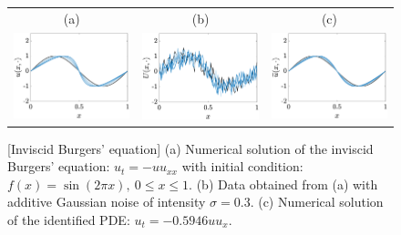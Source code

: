 \documentclass[a4paper,11pt]{article}
\begin{document}
\begin{figure}
\centering
\begin{tabular}{ccc}
(a)&(b)&(c)\\
\includegraphics[width=2in]{Figures/burgers_sol.eps}&
\includegraphics[width=2in]{Figures/burgers_noise.eps}&
\includegraphics[width=2in]{Figures/burgers_resimul.eps}
\end{tabular}
\caption{[Inviscid Burgers' equation] (a) Numerical solution of the inviscid Burgers' equation: $u_t=-uu_{xx}$ with initial condition: $f(x)=\sin(2\pi x),~0\leq x\leq 1$. (b) Data obtained from (a) with additive Gaussian noise of intensity $\sigma=0.3$. (c) Numerical solution of the identified PDE: $u_t=-0.5946uu_{x}$. }	\label{fig.burgers}
\end{figure}
\end{document}
